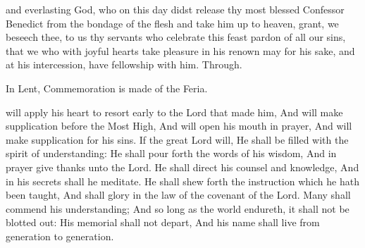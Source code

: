 \collect
{} and everlasting God, who on this day didst release thy most blessed Confessor Benedict from the bondage of the flesh and take him up to heaven, grant, we beseech thee, to us thy servants who celebrate this feast pardon of all our sins, that we who with joyful hearts take pleasure in his renown may for his sake, and at his intercession, have fellowship with him. Through.
\begin{rubric}
    In Lent, Commemoration is made of the Feria.
\end{rubric}

 will apply his heart to resort early to the Lord that made him, And will make supplication before the Most High, And will open his mouth in prayer, And will make supplication for his sins. If the great Lord will, He shall be filled with the spirit of understanding: He shall pour forth the words of his wisdom, And in prayer give thanks unto the Lord. He shall direct his counsel and knowledge, And in his secrets shall he meditate. He shall shew forth the instruction which he hath been taught, And shall glory in the law of the covenant of the Lord. Many shall commend his understanding; And so long as the world endureth, it shall not be blotted out: His memorial shall not depart, And his name shall live from generation to generation. 

